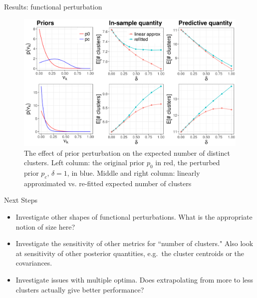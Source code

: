 \documentclass[10pt]{beamer}\usepackage[]{graphicx}\usepackage[]{color}
\newenvironment{knitrout}{}{} %
\begin{document}
\begin{frame}{Results: functional perturbation}
\begin{figure}
\centering

\begin{knitrout}
\color{fgcolor}

{\centering \includegraphics[width=0.98\linewidth,height=0.588\linewidth]{figure/functional_sens_plot_thresh0-1} 

}



\end{knitrout}
\caption{The effect of prior perturbation on the expected number of distinct clusters. Left column: the original prior $p_0$ in red, the perturbed prior $p_c$, $\delta = 1$, in blue. Middle and right column: linearly approximated vs.
re-fitted expected number of clusters}
\end{figure}

\end{frame}


\begin{frame}{Next Steps}

\begin{itemize}

\item Investigate other shapes of functional perturbations. What is the appropriate notion of size here?

\item Investigate the sensitivity of other metrics for ``number of clusters." Also look at sensitivity of other posterior quantities, e.g.\ the cluster centroids or the covariances. 

\item Investigate issues with multiple optima. Does extrapolating from more to less clusters actually give better performance?

\end{itemize}

\end{frame}
\end{document}
